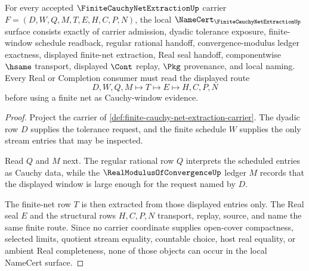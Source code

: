 \begin{theorem}\label{thm:finite-cauchy-net-extraction-namecert-obligations}
For every accepted $\FiniteCauchyNetExtractionUp$ carrier $F=(D,W,Q,M,T,E,H,C,P,N)$, the local $\NameCert_{\FiniteCauchyNetExtractionUp}$ surface consists exactly of carrier admission, dyadic tolerance exposure, finite-window schedule readback, regular rational handoff, convergence-modulus ledger exactness, displayed finite-net extraction, Real seal handoff, componentwise $\hsame$ transport, displayed $\Cont$ replay, $\Pkg$ provenance, and local naming. Every Real or Completion consumer must read the displayed route
$$
D,W,Q,M \longmapsto T \longmapsto E \longmapsto H,C,P,N
$$
before using a finite net as Cauchy-window evidence.
\end{theorem}
\begin{proof}
Project the carrier of \autoref{def:finite-cauchy-net-extraction-carrier}. The dyadic row $D$ supplies the tolerance request, and the finite schedule $W$ supplies the only stream entries that may be inspected.

Read $Q$ and $M$ next. The regular rational row $Q$ interprets the scheduled entries as Cauchy data, while the $\RealModulusOfConvergenceUp$ ledger $M$ records that the displayed window is large enough for the request named by $D$.

The finite-net row $T$ is then extracted from those displayed entries only. The Real seal $E$ and the structural rows $H,C,P,N$ transport, replay, source, and name the same finite route. Since no carrier coordinate supplies open-cover compactness, selected limits, quotient stream equality, countable choice, host real equality, or ambient Real completeness, none of those objects can occur in the local NameCert surface.
\end{proof}

